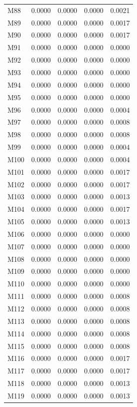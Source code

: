 \begin{longtable}{lrrrr}
M88 & 0.0000 & 0.0000 & 0.0000 & 0.0021 \\
M89 & 0.0000 & 0.0000 & 0.0000 & 0.0017 \\
M90 & 0.0000 & 0.0000 & 0.0000 & 0.0017 \\
M91 & 0.0000 & 0.0000 & 0.0000 & 0.0000 \\
M92 & 0.0000 & 0.0000 & 0.0000 & 0.0000 \\
M93 & 0.0000 & 0.0000 & 0.0000 & 0.0000 \\
M94 & 0.0000 & 0.0000 & 0.0000 & 0.0000 \\
M95 & 0.0000 & 0.0000 & 0.0000 & 0.0000 \\
M96 & 0.0000 & 0.0000 & 0.0000 & 0.0004 \\
M97 & 0.0000 & 0.0000 & 0.0000 & 0.0008 \\
M98 & 0.0000 & 0.0000 & 0.0000 & 0.0008 \\
M99 & 0.0000 & 0.0000 & 0.0000 & 0.0004 \\
M100 & 0.0000 & 0.0000 & 0.0000 & 0.0004 \\
M101 & 0.0000 & 0.0000 & 0.0000 & 0.0017 \\
M102 & 0.0000 & 0.0000 & 0.0000 & 0.0017 \\
M103 & 0.0000 & 0.0000 & 0.0000 & 0.0013 \\
M104 & 0.0000 & 0.0000 & 0.0000 & 0.0017 \\
M105 & 0.0000 & 0.0000 & 0.0000 & 0.0013 \\
M106 & 0.0000 & 0.0000 & 0.0000 & 0.0000 \\
M107 & 0.0000 & 0.0000 & 0.0000 & 0.0000 \\
M108 & 0.0000 & 0.0000 & 0.0000 & 0.0000 \\
M109 & 0.0000 & 0.0000 & 0.0000 & 0.0000 \\
M110 & 0.0000 & 0.0000 & 0.0000 & 0.0000 \\
M111 & 0.0000 & 0.0000 & 0.0000 & 0.0008 \\
M112 & 0.0000 & 0.0000 & 0.0000 & 0.0008 \\
M113 & 0.0000 & 0.0000 & 0.0000 & 0.0008 \\
M114 & 0.0000 & 0.0000 & 0.0000 & 0.0008 \\
M115 & 0.0000 & 0.0000 & 0.0000 & 0.0008 \\
M116 & 0.0000 & 0.0000 & 0.0000 & 0.0017 \\
M117 & 0.0000 & 0.0000 & 0.0000 & 0.0017 \\
M118 & 0.0000 & 0.0000 & 0.0000 & 0.0013 \\
M119 & 0.0000 & 0.0000 & 0.0000 & 0.0013 \\

\end{longtable}
